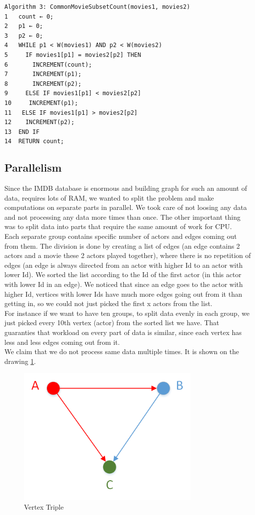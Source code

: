 \begin{verbatim}
Algorithm 3: CommonMovieSubsetCount(movies1, movies2)
1	count ← 0;
2	p1 ← 0;
3	p2 ← 0;
4	WHILE p1 < W(movies1) AND p2 < W(movies2)
5	  IF movies1[p1] = movies2[p2] THEN
6	    INCREMENT(count);
7	    INCREMENT(p1);
8	    INCREMENT(p2);
9	  ELSE IF movies1[p1] < movies2[p2]
10	   INCREMENT(p1);
11	 ELSE IF movies1[p1] > movies2[p2]
12	  INCREMENT(p2);
13	END IF
14	RETURN count;
\end{verbatim}

\subsection{Parallelism}
\label{Parallelism}
Since the IMDB database is enormous and building graph for such an amount of data, requires lots of RAM, we wanted to split the problem and make computations on separate parts in parallel. We took care of not loosing any data and not processing any data more times than once. The other important thing was to split data into parts that require the same amount of work for CPU.
\\
Each separate group contains specific number of actors and edges coming out from them. The division is done by creating a list of edges (an edge contains 2 actors and a movie these 2 actors played together), where there is no repetition of edges (an edge is always directed from an actor with higher Id to an actor with lower Id). We sorted the list according to the Id of the first actor (in this actor with lower Id in an edge). We noticed that since an edge goes to the actor with higher Id, vertices with lower Ids have much more edges going out from it than getting in, so we could not just picked the first x actors from the list. 
\\
For instance if we want to have ten groups, to split data evenly in each group, we just picked every 10th vertex (actor) from the sorted list we have. That guaranties that workload on every part of data is similar, since each vertex has less and less edges coming out from it.
\\
We claim that we do not process same data multiple times. It is shown on the drawing \ref{triple}.

\begin{figure}[ht!]
\centering
\includegraphics[width=90mm]{resources/triple.png}
\caption{Vertex Triple}
\label{triple}
\end{figure}

